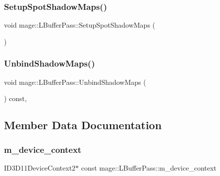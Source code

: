 \hypertarget{structmage_1_1_l_buffer_pass_a1ed3d550173e0145e363132656b8dfdb}{}\label{structmage_1_1_l_buffer_pass_a1ed3d550173e0145e363132656b8dfdb} 
\subsubsection{\texorpdfstring{Setup\+Spot\+Shadow\+Maps()}{SetupSpotShadowMaps()}}
{\footnotesize\ttfamily void mage\+::\+L\+Buffer\+Pass\+::\+Setup\+Spot\+Shadow\+Maps (\begin{DoxyParamCaption}{ }\end{DoxyParamCaption})\hspace{0.3cm}{\ttfamily [private]}}

\hypertarget{structmage_1_1_l_buffer_pass_af7abbf24eb7d20d9604beca5baa71f20}{}\label{structmage_1_1_l_buffer_pass_af7abbf24eb7d20d9604beca5baa71f20} 
\subsubsection{\texorpdfstring{Unbind\+Shadow\+Maps()}{UnbindShadowMaps()}}
{\footnotesize\ttfamily void mage\+::\+L\+Buffer\+Pass\+::\+Unbind\+Shadow\+Maps (\begin{DoxyParamCaption}{ }\end{DoxyParamCaption}) const\hspace{0.3cm}{\ttfamily [private]}, {\ttfamily [noexcept]}}



\subsection{Member Data Documentation}
\hypertarget{structmage_1_1_l_buffer_pass_a1dc7614ed09b8b7d2096bcb70a69e83e}{}\label{structmage_1_1_l_buffer_pass_a1dc7614ed09b8b7d2096bcb70a69e83e} 
\subsubsection{\texorpdfstring{m\+\_\+device\+\_\+context}{m\_device\_context}}
{\footnotesize\ttfamily I\+D3\+D11\+Device\+Context2$\ast$ const mage\+::\+L\+Buffer\+Pass\+::m\+\_\+device\+\_\+context\hspace{0.3cm}{\ttfamily [private]}}

